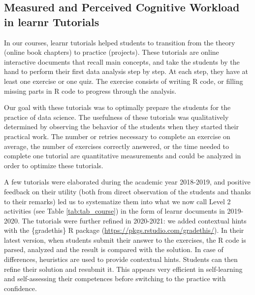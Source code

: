 \documentclass{aims} %
\theoremstyle{definition}
\begin{document}
\hypertarget{measured-and-perceived-cognitive-workload-in-learnr-tutorials-1}{%
\subsection{Measured and Perceived Cognitive Workload in learnr
Tutorials}\label{measured-and-perceived-cognitive-workload-in-learnr-tutorials-1}}

In our courses, learnr tutorials helped students to transition from the
theory (online book chapters) to practice (projects). These tutorials
are online interactive documents that recall main concepts, and take the
students by the hand to perform their first data analysis step by step.
At each step, they have at least one exercise or one quiz. The exercise
consists of writing R code, or filling missing parts in R code to
progress through the analysis.

Our goal with these tutorials was to optimally prepare the students for
the practice of data science. The usefulness of these tutorials was
qualitatively determined by observing the behavior of the students when
they started their practical work. The number or retries necessary to
complete an exercise on average, the number of exercises correctly
answered, or the time needed to complete one tutorial are quantitative
measurements and could be analyzed in order to optimize these tutorials.

A few tutorials were elaborated during the academic year 2018-2019, and
positive feedback on their utility (both from direct observation of the
students and thanks to their remarks) led us to systematize them into
what we now call Level 2 activities (see Table \ref {tab:tab_course}) in
the form of learnr documents in 2019-2020. The tutorials were further
refined in 2020-2021: we added contextual hints with the \{gradethis\} R
package (\url{https://pkgs.rstudio.com/gradethis/}). In their latest
version, when students submit their answer to the exercises, the R code
is parsed, analyzed and the result is compared with the solution. In
case of differences, heuristics are used to provide contextual hints.
Students can then refine their solution and resubmit it. This appears
very efficient in self-learning and self-assessing their competences
before switching to the practice with confidence.
\end{document}
